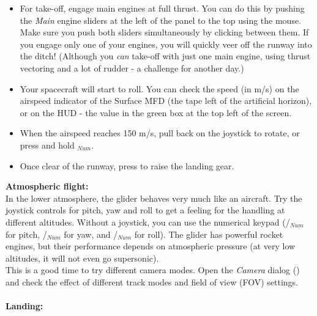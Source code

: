 \documentclass[Orbiter User Manual.tex]{subfiles}
\begin{document}
\begin{itemize}
\item For take-off, engage main engines at full thrust. You can do this by pushing the \textit{Main} engine sliders at the left of the panel to the top using the mouse. Make sure you push both sliders simultaneously by clicking between them. If you engage only one of your engines, you will quickly veer off the runway into the ditch! (Although you \textit{can} take-off with just one main engine, using thrust vectoring and a lot of rudder - a challenge for another day.)
\item Your spacecraft will start to roll. You can check the speed (in m/s) on the airspeed indicator of the Surface MFD (the tape left of the artificial horizon), or on the HUD - the value in the green box at the top left of the screen.
\item When the airspeed reaches 150 m/s, pull back on the joystick to rotate, or press and hold $_{Num}$.
\item Once clear of the runway, press  to raise the landing gear.
\end{itemize}

\noindent
\begin{figure}[H]
	\centering
\end{figure}

\noindent
\textbf{Atmospheric flight:}\\
In the lower atmosphere, the glider behaves very much like an aircraft. Try the joystick controls for pitch, yaw and roll to get a feeling for the handling at different altitudes. Without a joystick, you can use the numerical keypad (/$_{Num}$ for pitch, /$_{Num}$ for yaw, and /$_{Num}$ for roll). The glider has powerful rocket engines, but their performance depends on atmospheric pressure (at very low altitudes, it will not even go supersonic).\\
This is a good time to try different camera modes. Open the \textit{Camera} dialog (\Ctrl{}) and check the effect of different track modes and field of view (FOV) settings.\\
\\
\textbf{Landing:}
\end{document}
